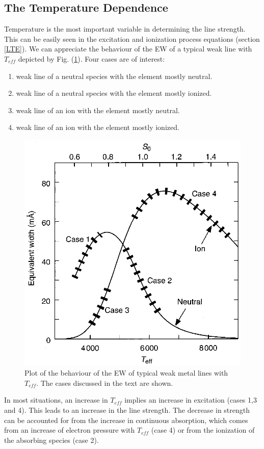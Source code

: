 \documentclass[dvips,12pt,a4paper]{report}
\begin{document}
{\subsection{The Temperature Dependence}

Temperature is the most important variable in determining the line strength.  This can be easily seen in the excitation and ionization process equations (section \ref{LTE}).
We can appreciate the behaviour of the EW of a typical weak line with $T_{eff}$ depicted by Fig. (\ref{ewdp}). Four cases are of interest:
\begin{enumerate}
 \item weak line of a neutral species with the element mostly neutral.
 \item weak line of a neutral species with the element mostly ionized.
 \item weak line of an ion with the element mostly neutral.
 \item weak line of an ion with the element mostly ionized.
\end{enumerate}
\begin{figure}[h]
\centering
\includegraphics[height=6 cm]{pics/parte2/temperature.eps}
\caption[EW dependence on Temperature and Pressure] {Plot of the behaviour of the EW of typical weak metal lines with $T_{eff}$. The cases discussed in the text are shown.}%
\label{ewdp}
\end{figure}

In most situations, an increase in $T_{eff}$ implies an increase in excitation (cases 1,3 and 4). This leads to an increase in the line strength. The decrease in strength can be accounted for from the increase in continuous absorption, which comes from an increase of electron pressure with $T_{eff}$ (case 4) or from the ionization of the absorbing species (case 2). 

}
\end{document}
